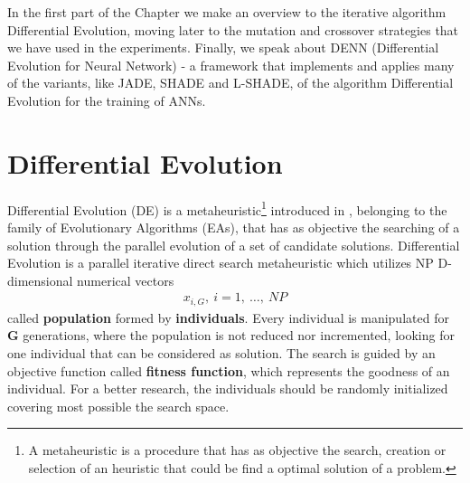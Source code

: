 \label{chap:differential-evolution}
In the first part of the Chapter we make an overview to the iterative algorithm Differential Evolution, moving later to the mutation and crossover strategies that we have used in the experiments. Finally, we speak about DENN (Differential Evolution for Neural Network) - a framework that implements and applies many of the variants, like JADE, SHADE and L-SHADE, of the algorithm Differential Evolution for the training of ANNs.


\section{Differential Evolution}
Differential Evolution (DE) is a metaheuristic\footnote{A metaheuristic is a procedure that has as objective the search, creation or selection of an heuristic that could be find a optimal solution of a problem.} introduced in \cite{DESEHGOCS:1997}, belonging to the family of Evolutionary Algorithms (EAs), that has as objective the searching of a solution through the parallel evolution of a set of candidate solutions.\newline\newline
Differential Evolution is a parallel iterative direct search metaheuristic which utilizes NP D-dimensional numerical vectors 
\begin{align}
	x_{i, G},\ i=1,\ \dots,\ NP 
\end{align}
called \textbf{population} formed by \textbf{individuals}. Every individual is manipulated for \textbf{G} generations, where the population is not reduced nor incremented, looking for one individual that can be considered as solution. The search is guided by an objective function called \textbf{fitness function}, which represents the goodness of an individual. For a better research, the individuals should be randomly initialized covering most possible the search space.\newline
